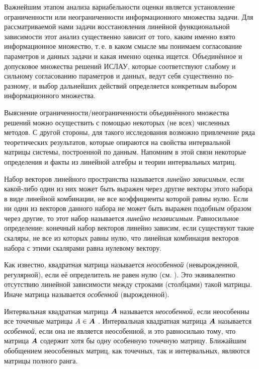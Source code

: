 \documentclass[a5paper,openany]{book}
\newcommand{\mbf}[1]{\protect\text{\boldmath$#1$}}
\begin{document}
Важнейшим этапом анализа вариабельности оценки является установление ограниченности 
или неограниченности информационного множества задачи. Для рассматриваемой нами задачи 
восстановления линейной функциональной зависимости этот анализ существенно зависит 
от того, каким именно взято информационное множество, т.\,е. в каком смысле мы понимаем 
согласование параметров и данных задачи и какая именно оценка ищется. Объединённое и 
допусковое множества решений ИСЛАУ, которые соответствуют слабому и сильному согласованию 
параметров и данных, ведут себя существенно по-разному, и выбор дальнейших действий 
определяется конкретным выбором информационного множества. 
  
Выяснение ограниченности/неограниченности объединённого множества решений можно осуществить 
с помощью некоторых (не всех) численных методов. С другой стороны, для такого исследования  
возможно привлечение ряда теоретических результатов, которые опираются на свойства 
интервальной матрицы системы, построенной по данным. Напомним в этой связи некоторые 
определения и факты из линейной алгебры и теории интервальных матриц. 
  
Набор векторов линейного пространства называется \emph{линейно зависимым}, если 
какой-либо один из них может быть выражен через другие векторы этого набора в виде 
линейной комбинации, не все коэффициенты которой равны нулю.  
Если ни один из векторов данного набора не может быть выражен подобным образом через 
другие, то этот набор называется \emph{линейно независимым}.  
Равносильное определение: конечный набор векторов линейно зависим, если существуют такие 
скаляры, не все из которых равны нулю, что линейная  комбинация векторов набора с этими 
скалярами равна нулевому вектору. 
    
Как известно, квадратная матрица называется \emph{неособенной} (невырожденной, 
регулярной), если её определитель не равен нулю (см. \cite{Gantmacher, Lankaster, 
HornJohn}). Это эквивалентно отсутствию линейной зависимости между строками 
(столбцами) такой матрицы. Иначе матрица называется \emph{особенной} (вырожденной). 
  
Интервальная квадратная матрица $\mbf{A}$ называется \emph{неособенной}, если 
неособенны все точечные матрицы $A\in\mbf{A}$ 
\cite{SSharyBook, NeumaierBook, RohnHandbook}. Интервальная квадратная матрица $\mbf{A}$ 
называется \emph{особенной}, если она не является неособенной, и это равносильно тому, 
что матрица $\mbf{A}$ содержит хотя бы одну особенную точечную матрицу. Ближайшим 
обобщением неособенных матриц, как точечных, так и интервальных, являются матрицы 
полного ранга.  
  
\end{document}

